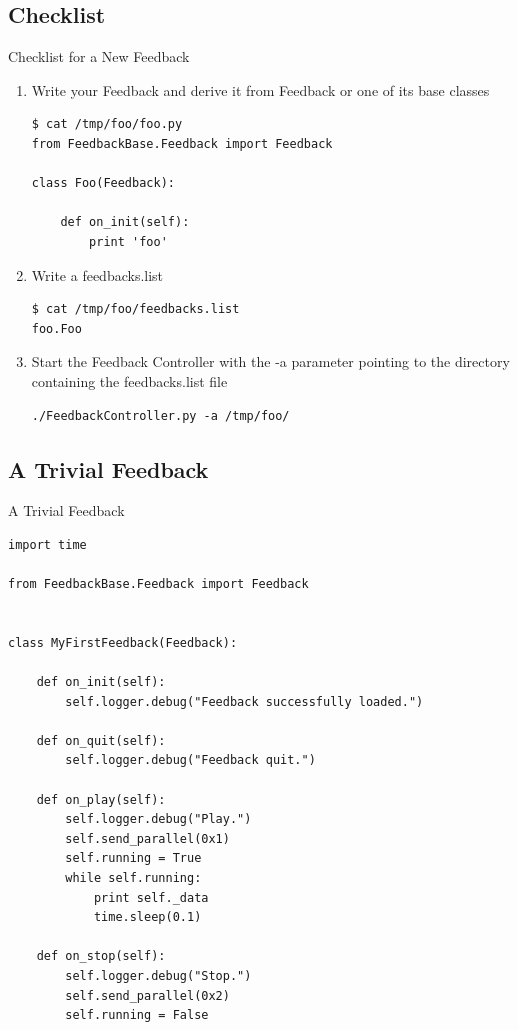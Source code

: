 \documentclass{beamer}
\begin{document}
\subsection{Checklist}
\begin{frame}[fragile]{Checklist for a New Feedback}
    \begin{enumerate}
        \item Write your Feedback and derive it from \alert{Feedback} or one of
            its base classes
            \begin{lstlisting}
$ cat /tmp/foo/foo.py
from FeedbackBase.Feedback import Feedback

class Foo(Feedback):

    def on_init(self):
        print 'foo'
            \end{lstlisting}
        \pause
        \item Write a \alert{feedbacks.list}
            \begin{lstlisting}
$ cat /tmp/foo/feedbacks.list
foo.Foo
            \end{lstlisting}
        \pause
        \item Start the Feedback Controller with the \alert{-a} parameter
            pointing to the directory containing the \alert{feedbacks.list}
            file
            \begin{lstlisting}
./FeedbackController.py -a /tmp/foo/
            \end{lstlisting}
    \end{enumerate}
\end{frame}

\subsection{A Trivial Feedback}
\begin{frame}[fragile]{A Trivial Feedback}
    \begin{lstlisting}
import time

from FeedbackBase.Feedback import Feedback


class MyFirstFeedback(Feedback):

    def on_init(self):
        self.logger.debug("Feedback successfully loaded.")

    def on_quit(self):
        self.logger.debug("Feedback quit.")

    def on_play(self):
        self.logger.debug("Play.")
        self.send_parallel(0x1)
        self.running = True
        while self.running:
            print self._data
            time.sleep(0.1)

    def on_stop(self):
        self.logger.debug("Stop.")
        self.send_parallel(0x2)
        self.running = False

    \end{lstlisting}
\end{frame}
\end{document}
